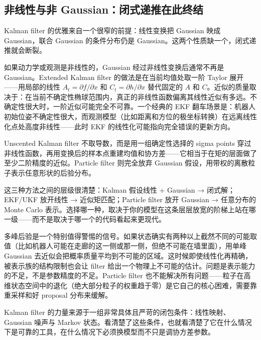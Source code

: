 \subsection{非线性与非 Gaussian：闭式递推在此终结}

Kalman filter 的优雅来自一个很窄的前提：线性变换把 Gaussian 映成 Gaussian，联合 Gaussian 的条件分布仍是 Gaussian。这两个性质缺一个，闭式递推就会断裂。

如果动力学或观测是非线性的，Gaussian 经过非线性变换后通常不再是 Gaussian。Extended Kalman filter 的做法是在当前均值处取一阶 Taylor 展开——用局部的线性 \(A_t = \partial f / \partial x\) 和 \(C_t = \partial h / \partial x\) 替代固定的 \(A\) 和 \(C\)。近似的质量取决于：在当前不确定性椭球范围内，真正的非线性函数偏离其线性近似有多远。不确定性很大时，一阶近似可能完全不可靠。一个经典的 EKF 翻车场景是：机器人初始位姿不确定性很大，而观测模型（比如距离和方位的极坐标转换）在远离线性化点处高度非线性——此时 EKF 的线性化可能指向完全错误的更新方向。

Unscented Kalman filter 不取导数，而是用一组确定性选择的 sigma points 穿过非线性函数，再用变换后的样本点重建均值和协方差——它相当于在矩的层面做了至少二阶精度的近似。Particle filter 则完全放弃 Gaussian 假设，用带权的离散粒子表示任意形状的后验分布。

这三种方法之间的层级很清楚：Kalman 假设线性 + Gaussian → 闭式解；EKF/UKF 放开线性 → 近似矩匹配；Particle filter 放开 Gaussian → 任意分布的 Monte Carlo 表示。选择哪一种，取决于你的模型在这条层层放宽的阶梯上站在哪一级——而不是取决于哪一个的代码看起来更现代。

多峰后验是一个特别值得警惕的信号。如果状态确实有两种以上截然不同的可能取值（比如机器人可能在走廊的这一侧或那一侧，但绝不可能在墙里面），用单峰 Gaussian 去近似会把概率质量平均到不可能的区域。这时候即使线性化再精确，被表示族的结构限制也会让 filter 给出一个物理上不可能的估计。问题是表示能力的不足，不是参数精度的不足。Particle filter 也不能解决所有问题——粒子在高维状态空间中的退化（绝大部分粒子的权重趋于零）是它自己的核心困难，需要靠重采样和好 proposal 分布来缓解。

Kalman filter 的力量来源于一组非常具体且严苛的闭包条件：线性映射、Gaussian 噪声与 Markov 状态。看清楚了这些条件，也就看清楚了它在什么情况下是可靠的工具，在什么情况下必须换模型而不只是调协方差参数。
